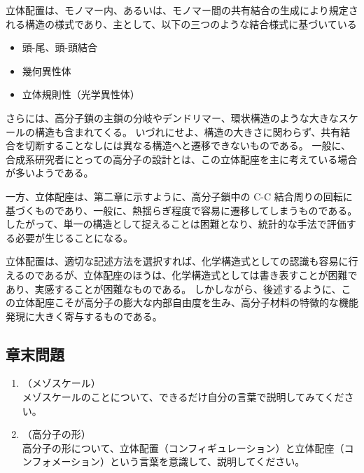 \documentclass[uplatex,dvipdfmx,a4paper,11pt, titlepage]{jsarticle}
\begin{document}
立体配置は、モノマー内、あるいは、モノマー間の共有結合の生成により規定される構造の様式であり、主として、以下の三つのような結合様式に基づいている
\vspace{-2mm}
\begin{itemize}
\item 
頭-尾、頭-頭結合
\item
幾何異性体
\item
立体規則性（光学異性体）
\end{itemize}
\vspace{-2mm}
さらには、高分子鎖の主鎖の分岐やデンドリマー、環状構造のような大きなスケールの構造も含まれてくる。
いづれにせよ、構造の大きさに関わらず、共有結合を切断することなしには異なる構造へと遷移できないものである。
一般に、合成系研究者にとっての高分子の設計とは、この立体配座を主に考えている場合が多いようである。

一方、立体配座は、第二章に示すように、高分子鎖中の C-C 結合周りの回転に基づくものであり、一般に、熱揺らぎ程度で容易に遷移してしまうものである。
したがって、単一の構造として捉えることは困難となり、統計的な手法で評価する必要が生じることになる。

立体配置は、適切な記述方法を選択すれば、化学構造式としての認識も容易に行えるのであるが、立体配座のほうは、化学構造式としては書き表すことが困難であり、実感することが困難なものである。
しかしながら、後述するように、この立体配座こそが高分子の膨大な内部自由度を生み、高分子材料の特徴的な機能発現に大きく寄与するものである。

\subsection{章末問題}

	\begin{enumerate}
		\item
		（メゾスケール）\\
		メゾスケールのことについて、できるだけ自分の言葉で説明してみてください。
		\item
		（高分子の形）\\
		高分子の形について、立体配置（コンフィギュレーション）と立体配座（コンフォメーション）という言葉を意識して、説明してください。

	\end{enumerate}
\newpage
\end{document}
